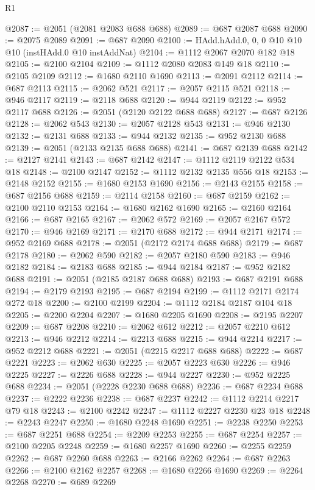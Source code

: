 \begin{lexlean}{R1}
\begin{coremodule}
@2087 := @2051 (@2081 @2083 @688 @688)
@2089 := @687 @2087 @688
@2090 := @2075 @2089
@2091 := @687 @2090
@2100 := HAdd.hAdd.{0, 0, 0} @10 @10 @10 (instHAdd.{0} @10 instAddNat)
@2104 := @1112 @2067 @2070 @182 @18
@2105 := @2100 @2104
@2109 := @1112 @2080 @2083 @149 @18
@2110 := @2105 @2109
@2112 := @1680 @2110 @1690
@2113 := @2091 @2112
@2114 := @687 @2113
@2115 := @2062 @521
@2117 := @2057 @2115 @521
@2118 := @946 @2117
@2119 := @2118 @688
@2120 := @944 @2119
@2122 := @952 @2117 @688
@2126 := @2051 (@2120 @2122 @688 @688)
@2127 := @687 @2126
@2128 := @2062 @543
@2130 := @2057 @2128 @543
@2131 := @946 @2130
@2132 := @2131 @688
@2133 := @944 @2132
@2135 := @952 @2130 @688
@2139 := @2051 (@2133 @2135 @688 @688)
@2141 := @687 @2139 @688
@2142 := @2127 @2141
@2143 := @687 @2142
@2147 := @1112 @2119 @2122 @534 @18
@2148 := @2100 @2147
@2152 := @1112 @2132 @2135 @556 @18
@2153 := @2148 @2152
@2155 := @1680 @2153 @1690
@2156 := @2143 @2155
@2158 := @687 @2156 @688
@2159 := @2114 @2158
@2160 := @687 @2159
@2162 := @2100 @2110 @2153
@2164 := @1680 @2162 @1690
@2165 := @2160 @2164
@2166 := @687 @2165
@2167 := @2062 @572
@2169 := @2057 @2167 @572
@2170 := @946 @2169
@2171 := @2170 @688
@2172 := @944 @2171
@2174 := @952 @2169 @688
@2178 := @2051 (@2172 @2174 @688 @688)
@2179 := @687 @2178
@2180 := @2062 @590
@2182 := @2057 @2180 @590
@2183 := @946 @2182
@2184 := @2183 @688
@2185 := @944 @2184
@2187 := @952 @2182 @688
@2191 := @2051 (@2185 @2187 @688 @688)
@2193 := @687 @2191 @688
@2194 := @2179 @2193
@2195 := @687 @2194
@2199 := @1112 @2171 @2174 @272 @18
@2200 := @2100 @2199
@2204 := @1112 @2184 @2187 @104 @18
@2205 := @2200 @2204
@2207 := @1680 @2205 @1690
@2208 := @2195 @2207
@2209 := @687 @2208
@2210 := @2062 @612
@2212 := @2057 @2210 @612
@2213 := @946 @2212
@2214 := @2213 @688
@2215 := @944 @2214
@2217 := @952 @2212 @688
@2221 := @2051 (@2215 @2217 @688 @688)
@2222 := @687 @2221
@2223 := @2062 @630
@2225 := @2057 @2223 @630
@2226 := @946 @2225
@2227 := @2226 @688
@2228 := @944 @2227
@2230 := @952 @2225 @688
@2234 := @2051 (@2228 @2230 @688 @688)
@2236 := @687 @2234 @688
@2237 := @2222 @2236
@2238 := @687 @2237
@2242 := @1112 @2214 @2217 @79 @18
@2243 := @2100 @2242
@2247 := @1112 @2227 @2230 @23 @18
@2248 := @2243 @2247
@2250 := @1680 @2248 @1690
@2251 := @2238 @2250
@2253 := @687 @2251 @688
@2254 := @2209 @2253
@2255 := @687 @2254
@2257 := @2100 @2205 @2248
@2259 := @1680 @2257 @1690
@2260 := @2255 @2259
@2262 := @687 @2260 @688
@2263 := @2166 @2262
@2264 := @687 @2263
@2266 := @2100 @2162 @2257
@2268 := @1680 @2266 @1690
@2269 := @2264 @2268
@2270 := @689 @2269

\end{coremodule}
\end{lexlean}
